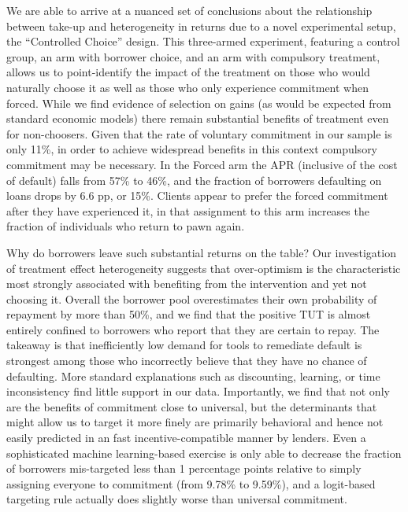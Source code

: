 \documentclass[oneside,11pt]{article}
\begin{document}
We are able to arrive at a nuanced set of conclusions about the relationship between take-up and heterogeneity in returns due to a novel experimental setup, the ``Controlled Choice'' design.  This three-armed experiment, featuring a control group, an arm with borrower choice, and an arm with compulsory treatment, allows us to point-identify the impact of the treatment on those who would naturally choose it as well as those who only experience commitment when forced.  While we find evidence of selection on gains (as would be expected from standard economic models) there remain substantial benefits of treatment even for non-choosers.  Given that the rate of voluntary commitment in our sample is only 11\%, in order to achieve widespread benefits in this context compulsory commitment may be necessary. In the Forced arm the APR (inclusive of the cost of default) falls from 57\% to 46\%, and the fraction of borrowers defaulting on loans drops by 6.6 pp, or 15\%. Clients appear to prefer the forced commitment after they have experienced it, in that assignment to this arm increases the fraction of individuals who return to pawn again.

Why do borrowers leave such substantial returns on the table? Our investigation of treatment effect heterogeneity suggests that over-optimism is the characteristic most strongly associated with benefiting from the intervention and yet not choosing it.  Overall the borrower pool overestimates their own probability of repayment by more than 50\%, and we find that the positive TUT is almost entirely confined to borrowers who report that they are certain to repay. The takeaway is that inefficiently low demand for tools to remediate default is strongest among those who incorrectly believe that they have no chance of defaulting.  More standard explanations such as discounting, learning, or time inconsistency find little support in our data.  Importantly, we find that not only are the benefits of commitment close to universal, but the determinants that might allow us to target it more finely are primarily behavioral and hence not easily predicted in an fast incentive-compatible manner by lenders.  Even a sophisticated machine learning-based exercise is only able to decrease the fraction of borrowers mis-targeted less than 1 percentage points relative to simply assigning everyone to commitment (from 9.78\% to 9.59\%), and a logit-based targeting rule actually does slightly worse than universal commitment.  
\end{document}
